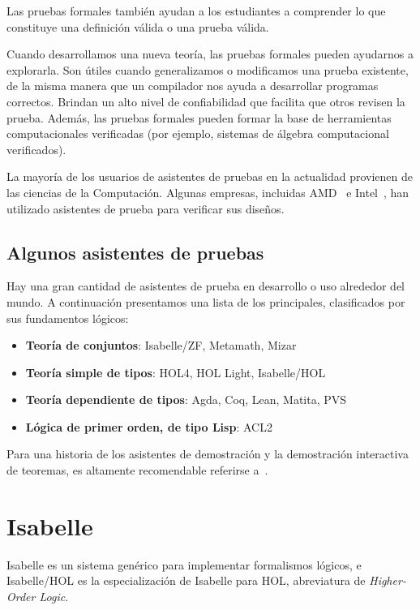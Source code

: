 \documentclass[12pt]{book}
\begin{document}
Las pruebas formales también ayudan a los estudiantes a comprender lo que constituye una definición válida o una prueba válida.

Cuando desarrollamos una nueva teoría, las pruebas formales pueden ayudarnos a explorarla. Son útiles cuando generalizamos o modificamos una prueba existente, de la misma manera que un compilador nos ayuda a desarrollar programas correctos. Brindan un alto nivel de confiabilidad que facilita que otros revisen la prueba.
Además, las pruebas formales pueden formar la base de herramientas computacionales verificadas (por ejemplo,
sistemas de álgebra computacional verificados).

La mayoría de los usuarios de asistentes de pruebas en la actualidad provienen de las ciencias de la Computación. Algunas empresas, incluidas AMD~\cite{Hitchhiker_amd} e Intel~\cite{Hitchhiker_intel}, han utilizado asistentes de prueba para verificar sus diseños.

\subsection{Algunos asistentes de pruebas}
Hay una gran cantidad de asistentes de prueba en desarrollo o uso alrededor del mundo. A continuación presentamos una lista de los principales, clasificados por sus fundamentos lógicos:

\begin{itemize}
	\item \textbf{Teoría de conjuntos}: Isabelle/ZF, Metamath, Mizar
	\item \textbf{Teoría simple de tipos}: HOL4, HOL Light, Isabelle/HOL
	\item \textbf{Teoría dependiente de tipos}: Agda, Coq, Lean, Matita, PVS
	\item \textbf{Lógica de primer orden, de tipo Lisp}: ACL2
\end{itemize}

Para una historia de los asistentes de demostración y la demostración interactiva de teoremas, es altamente recomendable referirse a~\cite{history_of_Interactive_Theorem_Proving}.



\section{Isabelle}

Isabelle es un sistema genérico para implementar formalismos lógicos, e Isabelle/HOL es la especialización de Isabelle para HOL, abreviatura de \textit{Higher-Order Logic}.
\end{document}
